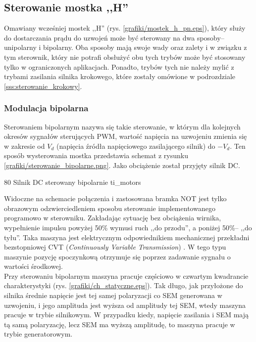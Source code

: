 \subsection{Sterowanie mostka ,,H''}

Omawiany wcześniej mostek ,,H'' (rys. \ref{grafiki/mostek_h_pn.eps}), który służy do dostarczania prądu do uzwojeń może być sterowany na dwa sposoby-- unipolarny i bipolarny. Oba sposoby mają swoje wady oraz zalety i w związku z tym sterownik, który nie potrafi obsłużyć obu tych trybów może być stosowany tylko w ograniczonych aplikacjach. Ponadto, trybów tych nie należy mylić z trybami zasilania silnika krokowego, które zostały omówione w podrozdziale \ref{sss:sterowanie_krokowy}.

\subsubsection{Modulacja bipolarna}

Sterowaniem bipolarnym nazywa się takie sterowanie, w którym dla kolejnych okresów sygnałów sterujących PWM, wartość napięcia na uzwojeniu zmienia się w zakresie od $ V_d $ (napięcia źródła napięciowego zasilającego silnik) do $ -V_d $. Ten sposób wysterowania mostka przedstawia schemat z rysunku \ref{grafiki/sterowanie_bipolarne.png}. Jako obciążenie został przyjęty silnik DC.

	{80}
	{Silnik DC sterowany bipolarnie}
	{ti_motors}
	
Widoczne na schemacie połączenia i zastosowana bramka NOT jest tylko obrazowym odzwierciedleniem sposobu sterowanie implementowanego programowo w sterowniku. Zakładając sytuację bez obciążenia wirnika, wypełnienie impulsu powyżej 50\% wymusi ruch ,,do przodu'', a poniżej 50\%-- ,,do tyłu''. Taka maszyna jest elektrycznym odpowiednikiem mechanicznej przekładni bezstopniowej CVT ({\it Continuously Variable Transmission}) \cite{ti_motors}. W tego typu maszynie pozycję spoczynkową otrzymuje się poprzez zadawanie sygnału o wartości środkowej. \\

Przy sterowaniu bipolarnym maszyna pracuje częściowo w czwartym kwadrancie charakterystyki (rys. \ref{grafiki/ch_statyczne.eps}). Tak długo, jak przyłożone do silnika średnie napięcie jest tej samej polaryzacji co SEM generowana w uzwojeniu, i jego amplituda jest wyższa od amplitudy tej SEM, wtedy maszyna pracuje w trybie silnikowym. W przypadku kiedy, napięcie zasilania i SEM mają tą samą polaryzację, lecz SEM ma wyższą amplitudę, to maszyna pracuje w trybie generatorowym. 

